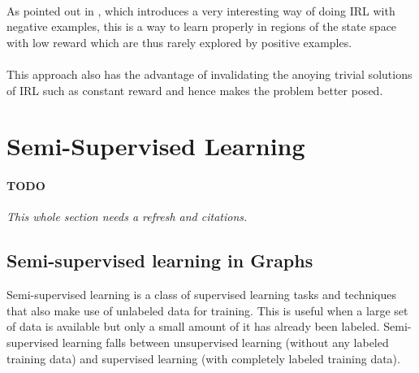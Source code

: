 \documentclass{article}
\begin{document}
\paragraph{}
As pointed out in \cite{Lee16}, which introduces a very interesting way of doing IRL with negative examples, this is a way to learn properly in regions of the state space with low reward which are thus rarely explored by positive examples.

\paragraph{}
This approach also has the advantage of invalidating the anoying trivial solutions of IRL such as constant reward and hence makes the problem better posed.



\section{Semi-Supervised Learning \label{sec:ssl}}

\paragraph{TODO} \emph{This whole section needs a refresh and citations.}

\subsection{Semi-supervised learning in Graphs}

Semi-supervised learning is a class of supervised learning tasks and techniques that also make use of unlabeled data for training. This is useful when a large set of data is available but only a small amount of it has already been labeled. Semi-supervised learning falls between unsupervised learning (without any labeled training data) and supervised learning (with completely labeled training data).
\end{document}
